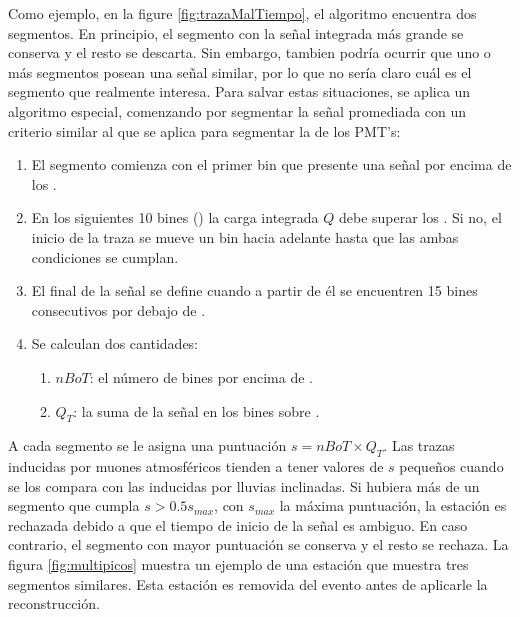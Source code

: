 		Como ejemplo, en la figure \ref{fig:trazaMalTiempo}, el algoritmo encuentra dos segmentos.
		En principio, el segmento con la señal integrada más grande se conserva y el resto se descarta.
		Sin embargo, tambien podría ocurrir que uno o más segmentos posean una señal similar, por lo que no sería claro cuál es el segmento que realmente interesa.
		Para salvar estas situaciones, se aplica un algoritmo especial, comenzando por segmentar la señal promediada con un criterio similar al que se aplica para segmentar la de los PMT's:
		\begin{enumerate}
		 \item El segmento comienza con el primer bin que presente una señal por encima de los .
		 \item En los siguientes 10 bines () la carga integrada $Q$ debe superar los . Si no, el inicio de la traza se mueve un bin hacia adelante hasta que las ambas condiciones se cumplan.
		 \item El final de la señal se define cuando a partir de él se encuentren 15 bines consecutivos por debajo de .
		 \item Se calculan dos cantidades:
		 \begin{enumerate}
		  \item $nBoT$: el número de bines por encima de .
		  \item $Q_T$: la suma de la señal en los bines sobre .
		 \end{enumerate}
		\end{enumerate}
		A cada segmento se le asigna una puntuación $s=nBoT\times Q_T$. 
		Las trazas inducidas por muones atmosféricos tienden a tener valores de $s$ pequeños cuando se los compara con las inducidas por lluvias inclinadas.
		Si hubiera más de un segmento que cumpla $s>0.5s_{max}$, con $s_{max}$ la máxima puntuación, la estación es rechazada debido a que el tiempo de inicio de la señal es ambiguo.
		En caso contrario, el segmento con mayor puntuación se conserva y el resto se rechaza.
		La figura \ref{fig:multipicos} muestra un ejemplo de una estación que muestra tres segmentos similares. Esta estación es removida del evento antes de aplicarle la reconstrucción.
